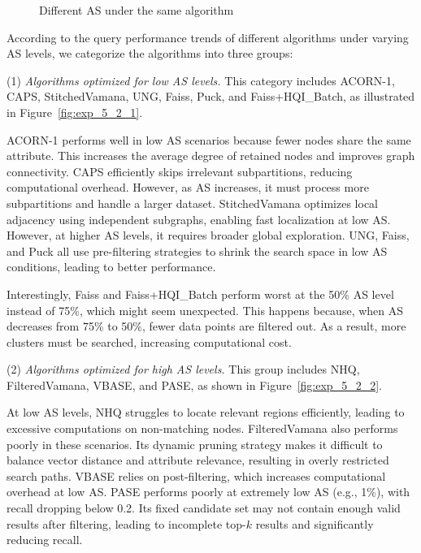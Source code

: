 \documentclass[sigconf, nonacm]{acmart}
\begin{document}
\begin{sloppypar}
\begin{figure}
    \setlength{\abovecaptionskip}{0cm}
    \setlength{\belowcaptionskip}{-0.4cm}
    \caption{Different AS under the same algorithm}
    \label{fig:exp_5_2_combined}
\end{figure}


According to the query performance trends of different algorithms under varying AS levels, we categorize the algorithms into three groups:

\par
(1) \textit{Algorithms optimized for low AS levels.}  
This category includes ACORN-1, CAPS, StitchedVamana, UNG, Faiss, Puck, and Faiss+HQI\_Batch, as illustrated in Figure~\ref{fig:exp_5_2_1}.

ACORN-1 performs well in low AS scenarios because fewer nodes share the same attribute. This increases the average degree of retained nodes and improves graph connectivity. CAPS efficiently skips irrelevant subpartitions, reducing computational overhead. However, as AS increases, it must process more subpartitions and handle a larger dataset. StitchedVamana optimizes local adjacency using independent subgraphs, enabling fast localization at low AS. However, at higher AS levels, it requires broader global exploration. UNG, Faiss, and Puck all use pre-filtering strategies to shrink the search space in low AS conditions, leading to better performance.

Interestingly, Faiss and Faiss+HQI\_Batch perform worst at the 50\% AS level instead of 75\%, which might seem unexpected. This happens because, when AS decreases from 75\% to 50\%, fewer data points are filtered out. As a result, more clusters must be searched, increasing computational cost.

\par
(2) \textit{Algorithms optimized for high AS levels.}  
This group includes NHQ, FilteredVamana, VBASE, and PASE, as shown in Figure~\ref{fig:exp_5_2_2}.

At low AS levels, NHQ struggles to locate relevant regions efficiently, leading to excessive computations on non-matching nodes. FilteredVamana also performs poorly in these scenarios. Its dynamic pruning strategy makes it difficult to balance vector distance and attribute relevance, resulting in overly restricted search paths.
VBASE relies on post-filtering, which increases computational overhead at low AS. PASE performs poorly at extremely low AS (e.g., 1\%), with recall dropping below 0.2. Its fixed candidate set may not contain enough valid results after filtering, leading to incomplete top-$k$ results and significantly reducing recall.


\end{sloppypar}
\end{document}
